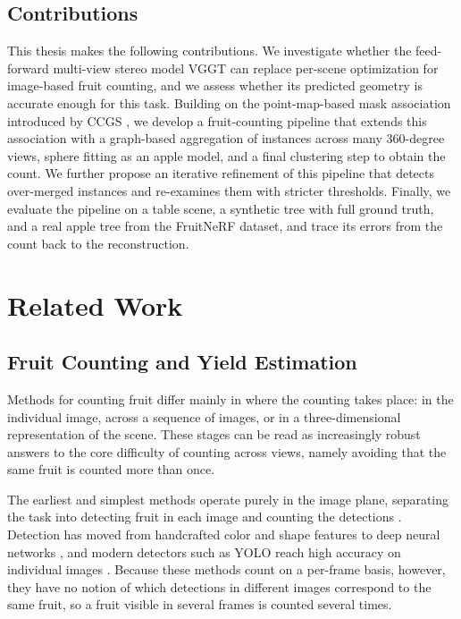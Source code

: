 \documentclass[english, egger, bsc]{vcethesis}
\begin{document}
\section{Contributions}
This thesis makes the following contributions. We investigate whether the feed-forward multi-view stereo model VGGT can replace per-scene optimization for image-based fruit counting, and we assess whether its predicted geometry is accurate enough for this task. Building on the point-map-based mask association introduced by CCGS \cite{hu2026ccgs}, we develop a fruit-counting pipeline that extends this association with a graph-based aggregation of instances across many 360-degree views, sphere fitting as an apple model, and a final clustering step to obtain the count. We further propose an iterative refinement of this pipeline that detects over-merged instances and re-examines them with stricter thresholds. Finally, we evaluate the pipeline on a table scene, a synthetic tree with full ground truth, and a real apple tree from the FruitNeRF dataset, and trace its errors from the count back to the reconstruction.

\chapter{Related Work}
\section{Fruit Counting and Yield Estimation}
Methods for counting fruit differ mainly in where the counting takes place: in the individual image, across a sequence of images, or in a three-dimensional representation of the scene. These stages can be read as increasingly robust answers to the core difficulty of counting across views, namely avoiding that the same fruit is counted more than once.

The earliest and simplest methods operate purely in the image plane, separating the task into detecting fruit in each image and counting the detections \cite{haeni2019}. Detection has moved from handcrafted color and shape features to deep neural networks \cite{miranda2023}, and modern detectors such as YOLO reach high accuracy on individual images \cite{ballenaruiz2025}. Because these methods count on a per-frame basis, however, they have no notion of which detections in different images correspond to the same fruit, so a fruit visible in several frames is counted several times. 
\end{document}
